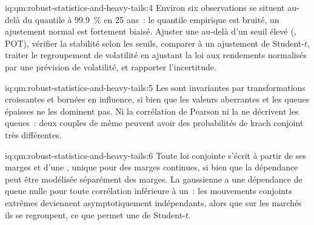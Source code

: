 \begin{solution}{iq:qm:robust-statistics-and-heavy-tails:4}
Environ six observations se situent au-delà du quantile à 99.9~\% en 25 ans~: le quantile empirique est bruité, un ajustement normal est fortement biaisé. Ajuster une
 au-delà d'un seuil élevé (, POT), vérifier la stabilité selon les seuils, comparer à un ajustement de Student-$t$,
traiter le regroupement de volatilité en ajustant la loi aux rendements normalisés par une prévision de volatilité, et rapporter l'incertitude.
\end{solution}

\begin{solution}{iq:qm:robust-statistics-and-heavy-tails:5}
Les  sont invariantes par transformations croissantes et bornées en influence, si bien que les valeurs aberrantes et les queues épaisses ne les dominent pas. Ni
la corrélation de Pearson ni la  ne décrivent les queues~: deux couples de même  peuvent avoir des probabilités de krach conjoint
très différentes.
\end{solution}

\begin{solution}{iq:qm:robust-statistics-and-heavy-tails:6}
Toute loi conjointe s'écrit à partir de ses marges et d'une , unique pour des marges continues, si bien que la dépendance peut être modélisée séparément des marges. La
 gaussienne a une dépendance de queue nulle pour toute corrélation inférieure à un~: les mouvements conjoints extrêmes deviennent asymptotiquement indépendants, alors que sur les marchés
ils se regroupent, ce que permet une  de Student-$t$.
\end{solution}
